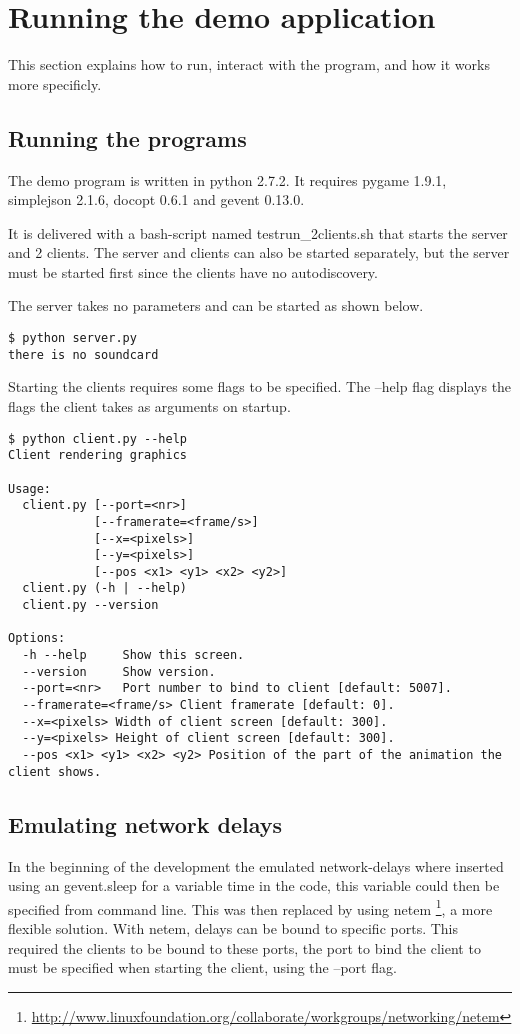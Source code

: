 \chapter{Running the demo application}

This section explains how to run, interact with the program, and how it works more specificly.

\section{Running the programs}
The demo program is written in python 2.7.2. It requires pygame 1.9.1, simplejson 2.1.6, docopt 0.6.1 and gevent 0.13.0. 

It is delivered with a bash-script named testrun\_2clients.sh that starts the server and 2 clients. The server and clients can also be started separately, but the server must be started first since the clients have no autodiscovery. 

The server takes no parameters and can be started as shown below. 

\begin{verbatim}
$ python server.py
there is no soundcard
\end{verbatim}

Starting the clients requires some flags to be specified. The --help flag displays the flags the client takes as arguments on startup. 

\begin{verbatim}
$ python client.py --help
Client rendering graphics

Usage:
  client.py [--port=<nr>]
            [--framerate=<frame/s>]
            [--x=<pixels>]
            [--y=<pixels>]
            [--pos <x1> <y1> <x2> <y2>]
  client.py (-h | --help)
  client.py --version

Options:
  -h --help     Show this screen.
  --version     Show version.
  --port=<nr>   Port number to bind to client [default: 5007].
  --framerate=<frame/s> Client framerate [default: 0].
  --x=<pixels> Width of client screen [default: 300].
  --y=<pixels> Height of client screen [default: 300].
  --pos <x1> <y1> <x2> <y2> Position of the part of the animation the client shows.
\end{verbatim}



\section{Emulating network delays}
In the beginning of the development the emulated network-delays where inserted using an gevent.sleep for a variable time in the code, this variable could then be specified from command line. This was then replaced by using netem \footnote{\url{http://www.linuxfoundation.org/collaborate/workgroups/networking/netem}}, a more flexible solution. With netem, delays can be bound to specific ports. This required the clients to be bound to these ports, the port to bind the client to must be specified when starting the client, using the --port flag. 


